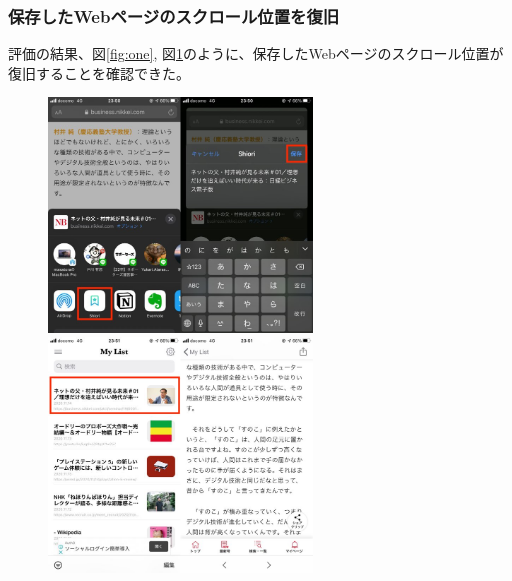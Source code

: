 \documentclass[a4j,10pt]{jsarticle}
\begin{document}
\subsubsection{保存したWebページのスクロール位置を復旧}
評価の結果、図\ref{fig:one}, 図\ref{fig:two}のように、保存したWebページのスクロール位置が復旧することを確認できた。
\begin{figure}[htbp]
    \begin{minipage}{0.5\hsize}
        \begin{center}
        \includegraphics[width=70mm]{../assets/scroll_position/scroll_position1.png}
        \end{center}
        \caption{}
        \label{fig:one}
    \end{minipage}
    \begin{minipage}{0.5\hsize}
        \begin{center}
        \includegraphics[width=70mm]{../assets/scroll_position/scroll_position2.png}
        \end{center}
        \caption{}
        \label{fig:two}
    \end{minipage}
\end{figure}
\end{document}
